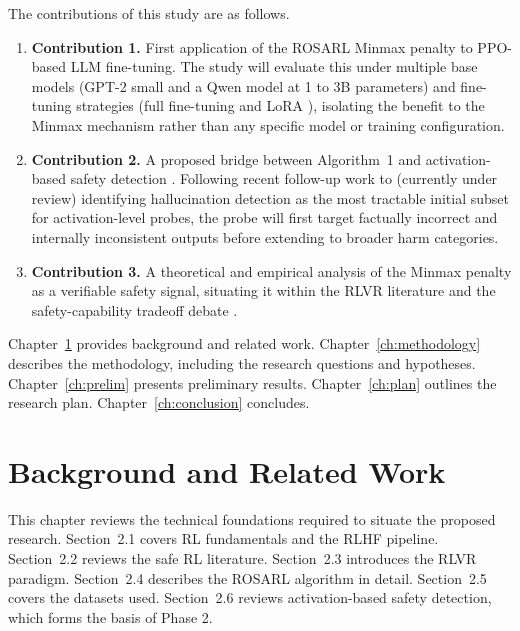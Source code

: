 \documentclass[a4paper,twoside,12pt]{report}
\begin{document}
The contributions of this study are as follows.

\begin{enumerate}
  \item \textbf{Contribution 1.} First application of the ROSARL Minmax penalty to
    PPO-based LLM fine-tuning. The study will evaluate this under multiple base models
    (GPT-2 small and a Qwen model at 1 to 3B parameters) and fine-tuning strategies (full
    fine-tuning and LoRA \citep{hu2022lora}), isolating the benefit to the Minmax mechanism
    rather than any specific model or training configuration.
  \item \textbf{Contribution 2.} A proposed bridge between Algorithm~1 and activation-based
    safety detection \citep{han2025safeswitch, rateike2023}. Following recent follow-up work
    to \citet{rateike2023} (currently under review) identifying hallucination detection as
    the most tractable initial subset for activation-level probes, the probe will first
    target factually incorrect and internally inconsistent outputs before extending to
    broader harm categories.
  \item \textbf{Contribution 3.} A theoretical and empirical analysis of the Minmax penalty
    as a verifiable safety signal, situating it within the RLVR literature
    \citep{lambert2024rlvr, youssef2025grpo} and the safety-capability tradeoff debate
    \citep{safetyrlvr2025}.
\end{enumerate}

Chapter~\ref{ch:background} provides background and related work.
Chapter~\ref{ch:methodology} describes the methodology, including the research questions
and hypotheses. Chapter~\ref{ch:prelim} presents preliminary results.
Chapter~\ref{ch:plan} outlines the research plan. Chapter~\ref{ch:conclusion} concludes.

\chapter{Background and Related Work}
\label{ch:background}

This chapter reviews the technical foundations required to situate the proposed research.
Section~2.1 covers RL fundamentals and the RLHF pipeline. Section~2.2 reviews the safe RL
literature. Section~2.3 introduces the RLVR paradigm. Section~2.4 describes the ROSARL
algorithm in detail. Section~2.5 covers the datasets used. Section~2.6 reviews
activation-based safety detection, which forms the basis of Phase 2.
\end{document}
